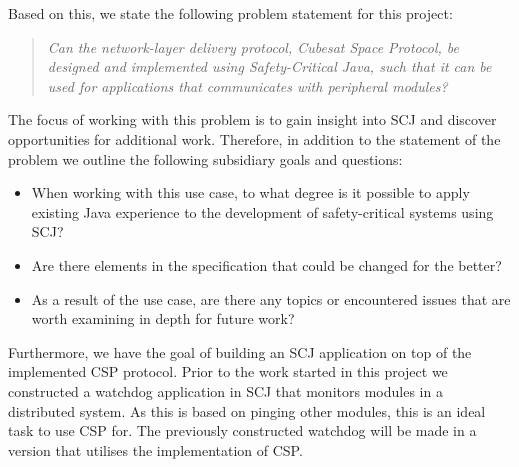 Based on this, we state the following problem statement for this project:
\begin{quotation}
	\textit{Can the network-layer delivery protocol, Cubesat Space Protocol, be designed and implemented using Safety-Critical Java, such that it can be used for applications that communicates with peripheral modules?}
\end{quotation}
The focus of working with this problem is to gain insight into SCJ and discover opportunities for additional work. Therefore, in addition to the statement of the problem we outline the following subsidiary goals and questions:
\begin{itemize}
	\item When working with this use case, to what degree is it possible to apply existing Java experience to the development of safety-critical systems using SCJ?
	\item Are there elements in the specification that could be changed for the better?
	\item As a result of the use case, are there any topics or encountered issues that are worth examining in depth for future work?
\end{itemize}

Furthermore, we have the goal of building an SCJ application on top of the implemented CSP protocol. Prior to the work started in this project we constructed a watchdog application in SCJ that monitors modules in a distributed system. As this is based on pinging other modules, this is an ideal task to use CSP for. The previously constructed watchdog will be made in a version that utilises the implementation of CSP.

